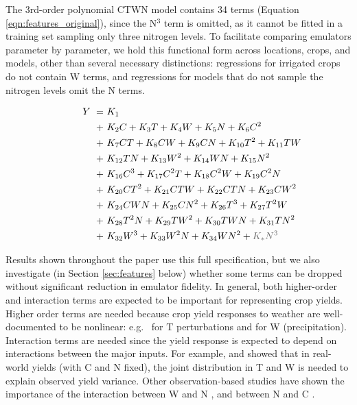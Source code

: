 \documentclass[gmdd]{copernicus} %
\begin{document}
The 3rd-order polynomial CTWN model contains 34 terms (Equation \ref{eqn:features_original}), since the N$^3$ term is omitted, as it cannot be fitted in a training set sampling only three nitrogen levels. 
To facilitate comparing emulators parameter by parameter, we hold this functional form across locations, crops, and models, other than several necessary distinctions: regressions for irrigated crops do not contain W terms, and regressions for models that do not sample the nitrogen levels omit the N terms. 

\vspace{-0.3in}
\begin{align}
    \hspace{10mm}  \label{eqn:features_original}
        Y\ = \ & K_{1} \\
        + \ & K_{2} C      + K_{3} T      + K_{4} W      + K_{5} N    + K_{6} C^2       \nonumber \\
        + \ & K_{7} C T    + K_{8} C W    + K_{9} C N    + K_{10} T^2 + K_{11} T W      \nonumber \\
        + \ & K_{12} T N   + K_{13} W^2   + K_{14} W N   + K_{15} N^2                   \nonumber \\
        + \ & K_{16} C^3   + K_{17} C^2 T + K_{18} C^2 W + K_{19} C^2 N                 \nonumber \\
        + \ & K_{20} C T^2 + K_{21} C T W + K_{22} C T N + K_{23} C W^2                 \nonumber \\
        + \ & K_{24} C W N + K_{25} C N^2 + K_{26} T^3   + K_{27} T^2 W                 \nonumber \\
        + \ & K_{28} T^2 N + K_{29} T W^2 + K_{30} T W N + K_{31} T N^2                 \nonumber \\
        + \ & K_{32} W^3   + K_{33} W^2 N + K_{34} W N^2 + {\color{dark-gray}K_{*} N^3} \nonumber
\end{align}

Results shown throughout the paper use this full specification, but we also investigate (in Section \ref{sec:features} below) whether some terms can be dropped without significant reduction in emulator fidelity.
In general, both higher-order and interaction terms are expected to be important for representing crop yields. Higher order terms are needed because crop yield responses to weather are well-documented to be nonlinear: e.g.\ \citet{Schlenker2009} for T perturbations and \citet{He2016} for W (precipitation). 
Interaction terms are needed since the yield response is expected to depend on interactions between the major inputs. 
For example, \citet{Lobell2007} and \citet{Tebaldi2008} showed that in real-world yields (with C and N fixed), the joint distribution in T and W is needed to explain observed yield variance.  
Other observation-based studies have shown the importance of the interaction between W and N \citep[e.g.][]{AULAKH2005}, and between N and C \citep{Mitsuru92, Nakamura97}.
\end{document}
